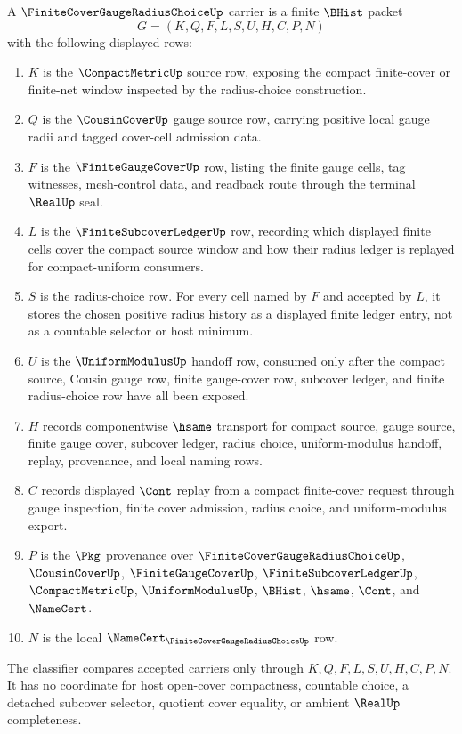 \begin{definition}
\label{def:finite-cover-gauge-radius-choice-carrier}
A $\FiniteCoverGaugeRadiusChoiceUp$ carrier is a finite $\BHist$ packet
$$
G=(K,Q,F,L,S,U,H,C,P,N)
$$
with the following displayed rows:
\begin{enumerate}
\item $K$ is the $\CompactMetricUp$ source row, exposing the compact finite-cover or finite-net window inspected by the radius-choice construction.
\item $Q$ is the $\CousinCoverUp$ gauge source row, carrying positive local gauge radii and tagged cover-cell admission data.
\item $F$ is the $\FiniteGaugeCoverUp$ row, listing the finite gauge cells, tag witnesses, mesh-control data, and readback route through the terminal $\RealUp$ seal.
\item $L$ is the $\FiniteSubcoverLedgerUp$ row, recording which displayed finite cells cover the compact source window and how their radius ledger is replayed for compact-uniform consumers.
\item $S$ is the radius-choice row. For every cell named by $F$ and accepted by $L$, it stores the chosen positive radius history as a displayed finite ledger entry, not as a countable selector or host minimum.
\item $U$ is the $\UniformModulusUp$ handoff row, consumed only after the compact source, Cousin gauge row, finite gauge-cover row, subcover ledger, and finite radius-choice row have all been exposed.
\item $H$ records componentwise $\hsame$ transport for compact source, gauge source, finite gauge cover, subcover ledger, radius choice, uniform-modulus handoff, replay, provenance, and local naming rows.
\item $C$ records displayed $\Cont$ replay from a compact finite-cover request through gauge inspection, finite cover admission, radius choice, and uniform-modulus export.
\item $P$ is the $\Pkg$ provenance over $\FiniteCoverGaugeRadiusChoiceUp$, $\CousinCoverUp$, $\FiniteGaugeCoverUp$, $\FiniteSubcoverLedgerUp$, $\CompactMetricUp$, $\UniformModulusUp$, $\BHist$, $\hsame$, $\Cont$, and $\NameCert$.
\item $N$ is the local $\NameCert_{\FiniteCoverGaugeRadiusChoiceUp}$ row.
\end{enumerate}
The classifier compares accepted carriers only through $K,Q,F,L,S,U,H,C,P,N$. It has no coordinate for host open-cover compactness, countable choice, a detached subcover selector, quotient cover equality, or ambient $\RealUp$ completeness.
\end{definition}

